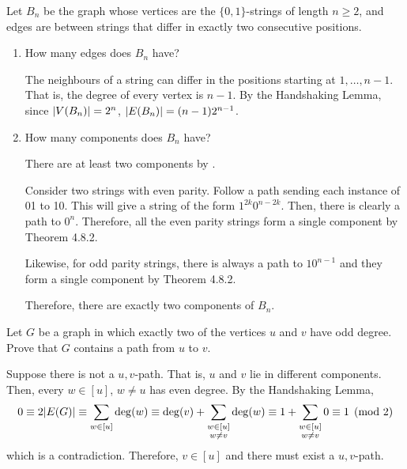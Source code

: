\begin{xca}
  Let $B_n$ be the graph whose vertices are the $\{0,1\}$-strings of length $n \geq 2$,
  and edges are between strings that differ in exactly two consecutive positions.
\end{xca}
\begin{enumerate}
  \item How many edges does $B_n$ have?
        \begin{sol}
          The neighbours of a string can differ in the positions starting at $1,\dotsc,n-1$.
          That is, the degree of every vertex is $n-1$.
          By the Handshaking Lemma, since $\abs{V(B_n)} = 2^n$,
          $\abs{E(B_n)} = (n-1)2^{n-1}$.
        \end{sol}
  \item How many components does $B_n$ have?
        \begin{sol}
          There are at least two components by .

          Consider two strings with even parity.
          Follow a path sending each instance of 01 to 10.
          This will give a string of the form $1^{2k}0^{n-2k}$.
          Then, there is clearly a path to $0^n$.
          Therefore, all the even parity strings form a single component by Theorem 4.8.2.

          Likewise, for odd parity strings, there is always a path to $10^{n-1}$
          and they form a single component by Theorem 4.8.2.

          Therefore, there are exactly two components of $B_n$.
        \end{sol}
\end{enumerate}

\begin{xca}
  Let $G$ be a graph in which exactly two of the vertices $u$ and $v$ have odd degree.
  Prove that $G$ contains a path from $u$ to $v$.
\end{xca}
\begin{prf}
  Suppose there is not a $u,v$-path.
  That is, $u$ and $v$ lie in different components.
  Then, every $w \in [u]$, $w \neq u$ has even degree.
  By the Handshaking Lemma, 
  \[ 
    0 \equiv 2\abs{E(G)}
    \equiv \sum_{w \in [u]} \deg(w)
    \equiv \deg(v) + \sum_{\substack{w \in [u] \\ w \neq v}}\deg(w)
    \equiv 1 + \sum_{\substack{w \in [u]\\w \neq v}}0 \equiv 1 \pmod{2}
  \]
  which is a contradiction. Therefore, $v \in [u]$ and there must exist a $u,v$-path.
\end{prf}
